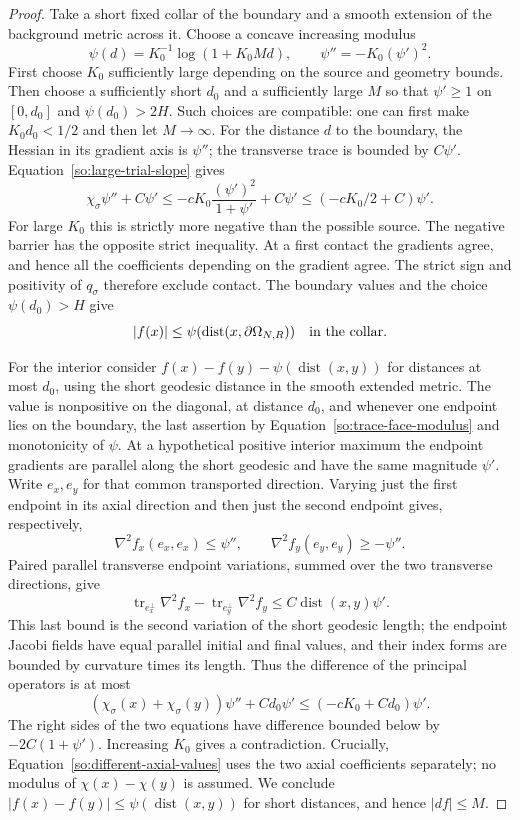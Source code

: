 \begin{proof}
Take a short fixed collar of the boundary and a smooth extension of
the background metric across it.  Choose a concave increasing modulus
\[
 \psi(d)=K_0^{-1}\log(1+K_0Md),\qquad
 \psi''=-K_0(\psi')^2.
\]
First choose $K_0$ sufficiently large depending on the source and
geometry bounds.  Then choose a sufficiently short $d_0$ and a
sufficiently large $M$ so that $\psi'\ge1$ on $[0,d_0]$ and
$\psi(d_0)>2H$.  Such choices are compatible: one can first make
$K_0d_0<1/2$ and then let $M\to\infty$.
For the distance $d$ to the boundary, the Hessian in its gradient
axis is $\psi''$; the transverse trace is bounded by $C\psi'$.
Equation~\ref{so:large-trial-slope} gives
\[
 \chi_\sigma\psi''+C\psi'
 \le-cK_0\frac{(\psi')^2}{1+\psi'}+C\psi'
 \le(-cK_0/2+C)\psi'.
\]
For large $K_0$ this is strictly more negative than the possible source.
The negative barrier has the opposite strict inequality.  At a first
contact the gradients agree, and hence all the coefficients depending
on the gradient agree.  The strict sign and positivity of $q_\sigma$
therefore exclude contact.  The boundary values and the
choice $\psi(d_0)>H$ give
\begin{equation}\label{so:trace-face-modulus}
 |f(x)|\le\psi(\operatorname{dist}(x,\partial\Omega_{N,R}))
 \quad\hbox{in the collar}.
\end{equation}

For the interior consider
$f(x)-f(y)-\psi(\operatorname{dist}(x,y))$ for distances at most $d_0$,
using the short geodesic distance in the smooth extended metric.
The value is nonpositive on the diagonal, at distance $d_0$, and
whenever one endpoint lies on the boundary, the last assertion by
Equation~\ref{so:trace-face-modulus} and monotonicity of $\psi$.
At a hypothetical positive interior maximum the endpoint gradients
are parallel along the short geodesic and have the same magnitude
$\psi'$.  Write $e_x,e_y$ for that common transported direction.
Varying just the first endpoint in its axial direction and then just
the second endpoint gives, respectively,
\[
 \nabla^2 f_x(e_x,e_x)\le\psi'',\qquad
 \nabla^2 f_y(e_y,e_y)\ge-\psi''.
\]
Paired parallel transverse endpoint variations, summed over the two
transverse directions, give
\[
 \operatorname{tr}_{e_x^\perp}\nabla^2f_x
 -\operatorname{tr}_{e_y^\perp}\nabla^2f_y
 \le C\operatorname{dist}(x,y)\psi'.
\]
This last bound is the second variation of the short geodesic length;
the endpoint Jacobi fields have equal parallel initial and final
values, and their index forms are bounded by curvature times its
length.  Thus the difference of the principal operators is at most
\begin{equation}\label{so:different-axial-values}
 (\chi_\sigma(x)+\chi_\sigma(y))\psi''+Cd_0\psi'
 \le(-cK_0+Cd_0)\psi'.
\end{equation}
The right sides of the two equations have difference bounded below
by $-2C(1+\psi')$.  Increasing $K_0$ gives a contradiction.  Crucially,
Equation~\ref{so:different-axial-values} uses the two axial coefficients
separately; no modulus of $\chi(x)-\chi(y)$ is assumed.  We conclude
$|f(x)-f(y)|\le\psi(\operatorname{dist}(x,y))$ for short distances,
and hence $|df|\le M$.


\end{proof}
